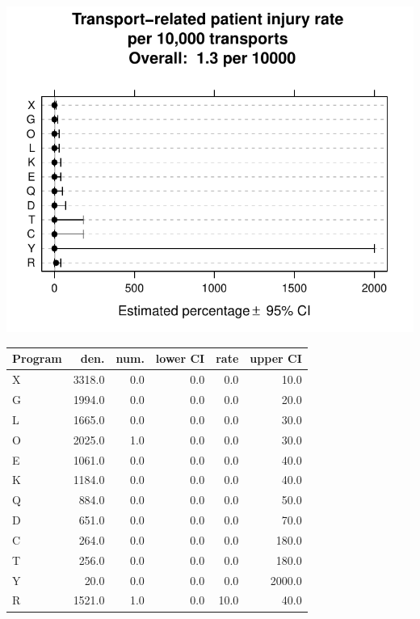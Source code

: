 \documentclass[twoside]{article}\usepackage[]{graphicx}\usepackage[]{color}
\makeatletter
\def\maxwidth{ %
  \ifdim\Gin@nat@width>\linewidth
    \linewidth
  \else
    \Gin@nat@width
  \fi
}
\newenvironment{knitrout}{}{} %
\makeatother
\begin{document}
\begin{center}
\begin{knitrout}
\color{fgcolor}
\includegraphics[width=\maxwidth]{figure/r_patient_injuries} 

\end{knitrout}

\end{center}

\begin{table}[ht]
\centering
\begin{tabular}{lrrrrr}
  \hline
Program & den. & num. & lower CI & rate & upper CI \\ 
  \hline
X & 3318.0 & 0.0 & 0.0 & 0.0 & 10.0 \\ 
  G & 1994.0 & 0.0 & 0.0 & 0.0 & 20.0 \\ 
  L & 1665.0 & 0.0 & 0.0 & 0.0 & 30.0 \\ 
  O & 2025.0 & 1.0 & 0.0 & 0.0 & 30.0 \\ 
  E & 1061.0 & 0.0 & 0.0 & 0.0 & 40.0 \\ 
  K & 1184.0 & 0.0 & 0.0 & 0.0 & 40.0 \\ 
  Q & 884.0 & 0.0 & 0.0 & 0.0 & 50.0 \\ 
  D & 651.0 & 0.0 & 0.0 & 0.0 & 70.0 \\ 
  C & 264.0 & 0.0 & 0.0 & 0.0 & 180.0 \\ 
  T & 256.0 & 0.0 & 0.0 & 0.0 & 180.0 \\ 
  Y & 20.0 & 0.0 & 0.0 & 0.0 & 2000.0 \\ 
  R & 1521.0 & 1.0 & 0.0 & 10.0 & 40.0 \\ 
   \hline
\end{tabular}
\end{table}
\end{document}
